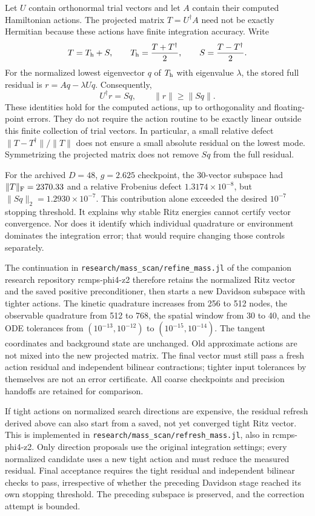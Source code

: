 \documentclass[11pt]{article}
\begin{document}
Let $U$ contain orthonormal trial vectors and let $A$ contain their computed
Hamiltonian actions. The projected matrix $T=U^\dagger A$ need not be exactly
Hermitian because these actions have finite integration accuracy. Write
\begin{equation}
 T=T_{\rm h}+S,\qquad
 T_{\rm h}=\frac{T+T^\dagger}{2},\qquad
 S=\frac{T-T^\dagger}{2}.
\end{equation}
For the normalized lowest eigenvector $q$ of $T_{\rm h}$ with eigenvalue
$\lambda$, the stored full residual is $r=Aq-\lambda Uq$. Consequently,
\begin{equation}
 U^\dagger r=S q,\qquad \|r\|\geq\|S q\|.
\end{equation}
These identities hold for the computed actions, up to orthogonality and
floating-point errors. They do not require the action routine to be exactly
linear outside this finite collection of trial vectors. In particular,
a small relative defect $\|T-T^\dagger\|/\|T\|$ does not ensure a small
absolute residual on the lowest mode. Symmetrizing the projected matrix
does not remove $S q$ from the full residual.

For the archived $D=48$, $g=2.625$ checkpoint, the 30-vector subspace had
$\|T\|_{\rm F}=2370.33$ and a relative Frobenius defect
$1.3174\times10^{-8}$, but $\|S q\|_2=1.2930\times10^{-7}$.
This contribution alone exceeded the desired $10^{-7}$ stopping threshold.
It explains why stable Ritz energies cannot certify vector convergence.
Nor does it identify which individual quadrature or environment dominates
the integration error; that would require changing those controls separately.

The continuation in \texttt{research/mass\_scan/refine\_mass.jl} of the
companion research repository rcmps-phi4-z2 therefore
retains the normalized Ritz vector and the saved positive preconditioner,
then starts a new Davidson subspace with tighter actions. The kinetic
quadrature increases from 256 to 512 nodes, the observable quadrature from
512 to 768, the spatial window from 30 to 40, and the ODE tolerances from
$(10^{-13},10^{-12})$ to $(10^{-15},10^{-14})$.
The tangent coordinates and background state are unchanged. Old approximate
actions are not mixed into the new projected matrix. The final vector must
still pass a fresh action residual and independent bilinear contractions;
tighter input tolerances by themselves are not an error certificate.
All coarse checkpoints and precision handoffs are retained for comparison.

If tight actions on normalized search directions are expensive, the residual
refresh derived above can also start from a saved, not yet converged tight
Ritz vector. This is implemented in
\texttt{research/mass\_scan/refresh\_mass.jl}, also in rcmps-phi4-z2.
Only direction proposals use
the original integration settings; every normalized candidate uses a new
tight action and must reduce the measured residual. Final acceptance requires
the tight residual and independent bilinear checks to pass, irrespective of
whether the preceding Davidson stage reached its own stopping threshold.
The preceding subspace is preserved, and the correction attempt is bounded.
\end{document}
